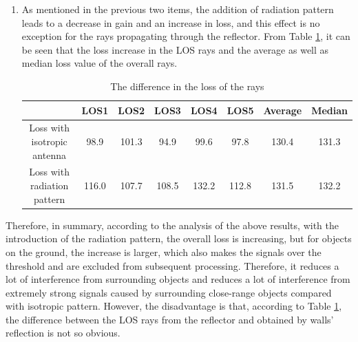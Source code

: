 \documentclass[12pt,DIV14,BCOR12mm,a4paper,footinclude=false,headinclude,parskip=half-,twoside,openright,cleardoublepage=empty,toc=index,bibliography=totoc,listof=totoc]{scrreprt}
\numberwithin{equation}{chapter}
\begin{document}
\begin{enumerate}[label=\textbullet]
    \item As mentioned in the previous two items, the addition of radiation pattern leads to a decrease in gain and an increase in loss, and this effect is no exception for the rays propagating through the reflector. From Table \ref{difference in the loss of the rays}, it can be seen that the loss increase in the LOS rays and the average as well as median loss value of the overall rays.

    \begin{table}
    \centering
    \caption{The difference in the loss of the rays}
    \label{difference in the loss of the rays}
    \begin{tabular}{lccccccc}
        \hline
        \multicolumn{1}{l|}{} & \multicolumn{1}{c|}{LOS1} & \multicolumn{1}{c|}{LOS2} & \multicolumn{1}{c|}{LOS3} & \multicolumn{1}{c|}{LOS4} & \multicolumn{1}{c|}{LOS5} & \multicolumn{1}{c|}{Average} & \multicolumn{1}{c}{Median}\\
        \hline

        \multicolumn{1}{c|}{Loss with isotropic antenna} & \multicolumn{1}{c|}{98.9} & \multicolumn{1}{c|}{101.3} & \multicolumn{1}{c|}{94.9} & \multicolumn{1}{c|}{99.6} & \multicolumn{1}{c|}{97.8} & \multicolumn{1}{c|}{130.4} & \multicolumn{1}{c}{131.3}\\
        \hline

        \multicolumn{1}{c|}{Loss with radiation pattern} & \multicolumn{1}{c|}{116.0} & \multicolumn{1}{c|}{107.7} & \multicolumn{1}{c|}{108.5} & \multicolumn{1}{c|}{132.2} & \multicolumn{1}{c|}{112.8} & \multicolumn{1}{c|}{131.5} & \multicolumn{1}{c}{132.2}\\
        \hline
    \end{tabular}
    \end{table}

\end{enumerate}

Therefore, in summary, according to the analysis of the above results, with the introduction of the radiation pattern, the overall loss is increasing, but for objects on the ground, the increase is larger, which also makes the signals over the threshold and are excluded from subsequent processing. Therefore, it reduces a lot of interference from surrounding objects and reduces a lot of interference from extremely strong signals caused by surrounding close-range objects compared with isotropic pattern. However, the disadvantage is that, according to Table \ref{difference in the loss of the rays}, the difference between the LOS rays from the reflector and obtained by walls' reflection is not so obvious. 
\end{document}
